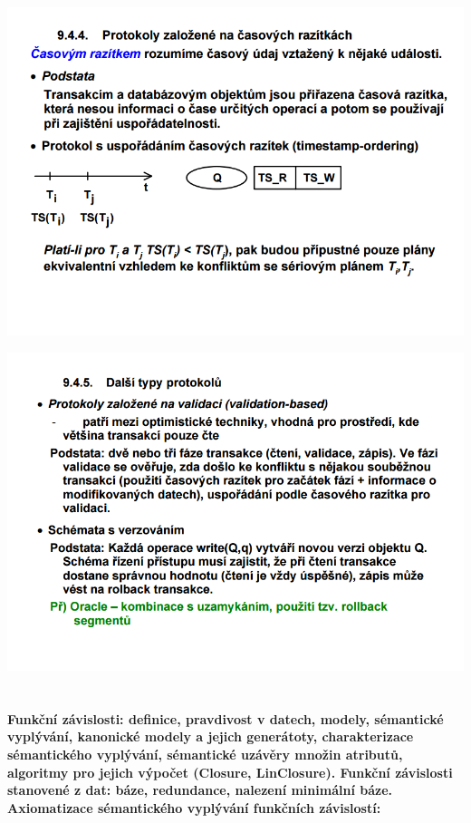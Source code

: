 \documentclass[10pt,a4paper]{article}
\begin{document}
\includegraphics[scale=0.5]{img/84}

\includegraphics[scale=0.5]{img/85}






\section{}
\newcommand{\M}{\mathscr{M}}
\newcommand{\G}{\Gamma}

\lstset{
  basicstyle=\ttfamily,
  mathescape
}

\paragraph{Funkční závislosti: definice, pravdivost v datech, modely, sémantické vyplývání, kanonické modely a jejich generátoty,
charakterizace sémantického vyplývání, sémantické uzávěry množin atributů, algoritmy pro jejich
výpočet (Closure, LinClosure). Funkční závislosti stanovené z dat: báze, redundance, nalezení minimální báze.
Axiomatizace sémantického vyplývání funkčních závislostí:}
\end{document}
